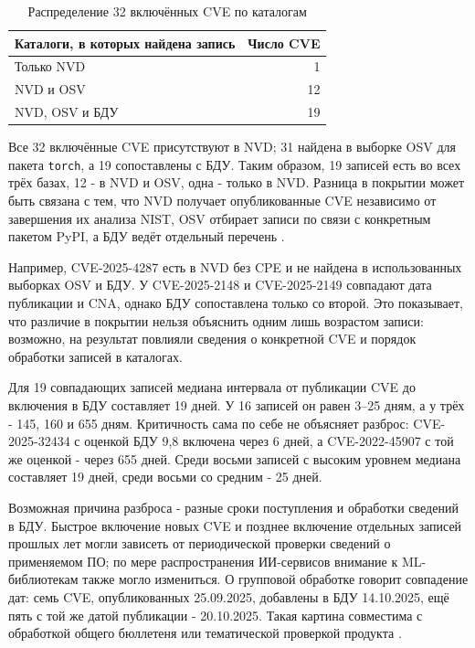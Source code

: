 \documentclass[12pt,a4paper]{report}
\begin{document}
\begin{table}[ht]
\centering
\caption{Распределение 32 включённых CVE по каталогам}
\begin{tabular}{|l|r|}
\hline
\rowcolor{gray!15}
Каталоги, в которых найдена запись & Число CVE \\
\hline
Только NVD & 1 \\
\hline
NVD и OSV & 12 \\
\hline
NVD, OSV и БДУ & 19 \\
\hline
\end{tabular}
\end{table}

Все 32 включённые CVE присутствуют в NVD; 31 найдена в выборке OSV для пакета \texttt{torch}, а 19 сопоставлены с БДУ. Таким образом, 19 записей есть во всех трёх базах, 12 - в NVD и OSV, одна - только в NVD. Разница в покрытии может быть связана с тем, что NVD получает опубликованные CVE независимо от завершения их анализа NIST, OSV отбирает записи по связи с конкретным пакетом PyPI, а БДУ ведёт отдельный перечень \cite{nvdgeneral,osvdata,bdu}.

Например, CVE-2025-4287 есть в NVD без CPE и не найдена в использованных выборках OSV и БДУ. У CVE-2025-2148 и CVE-2025-2149 совпадают дата публикации и CNA, однако БДУ сопоставлена только со второй. Это показывает, что различие в покрытии нельзя объяснить одним лишь возрастом записи: возможно, на результат повлияли сведения о конкретной CVE и порядок обработки записей в каталогах.

Для 19 совпадающих записей медиана интервала от публикации CVE до включения в БДУ составляет 19 дней. У 16 записей он равен 3--25 дням, а у трёх - 145, 160 и 655 дням. Критичность сама по себе не объясняет разброс: CVE-2025-32434 с оценкой БДУ 9,8 включена через 6 дней, а CVE-2022-45907 с той же оценкой - через 655 дней. Среди восьми записей с высоким уровнем медиана составляет 19 дней, среди восьми со средним - 25 дней.

Возможная причина разброса - разные сроки поступления и обработки сведений в БДУ. Быстрое включение новых CVE и позднее включение отдельных записей прошлых лет могли зависеть от периодической проверки сведений о применяемом ПО; по мере распространения ИИ-сервисов внимание к ML-библиотекам также могло измениться. О групповой обработке говорит совпадение дат: семь CVE, опубликованных 25.09.2025, добавлены в БДУ 14.10.2025, ещё пять с той же датой публикации - 20.10.2025. Такая картина совместима с обработкой общего бюллетеня или тематической проверкой продукта \cite{bdu}.
\end{document}
